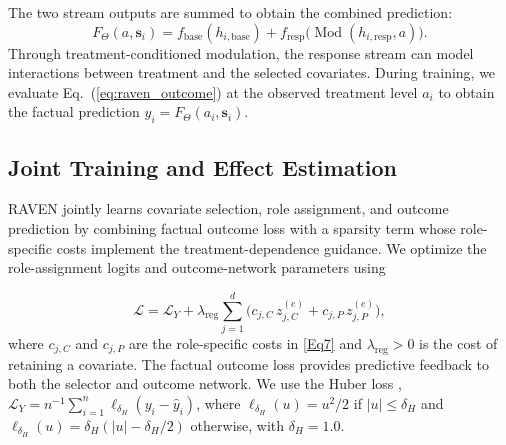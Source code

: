 \documentclass[twoside]{article}
\theoremstyle{plain}
\theoremstyle{definition}
\theoremstyle{remark}
\newtheorem{proof sketch}[theorem]{Proof Sketch}
\begin{document}
The two stream outputs are summed to obtain the combined prediction:
\begin{equation}
\label{eq:raven_outcome}
F_\Theta(a,\mathbf{s}_i)
=
f_{\mathrm{base}}(h_{i,\mathrm{base}})
+
f_{\mathrm{resp}}\bigl(\operatorname{Mod}(h_{i,\mathrm{resp}},a)\bigr).
\end{equation}
Through treatment-conditioned modulation, the response stream can model interactions between treatment and the selected covariates.
During training, we evaluate Eq.~(\ref{eq:raven_outcome}) at the observed treatment level $a_i$ to obtain the factual prediction $\widehat{y}_i=F_\Theta(a_i,\mathbf{s}_i)$.

\subsection{Joint Training and Effect Estimation}
\label{sec:end_to_end_training}
RAVEN jointly learns covariate selection, role assignment, and outcome prediction by combining factual outcome loss with a sparsity term whose role-specific costs implement the treatment-dependence guidance.
We optimize the role-assignment logits and outcome-network parameters using


\begin{equation}
\label{eq:raven_training}
\mathcal{L}=\mathcal{L}_Y+\lambda_{\mathrm{reg}}\sum_{j=1}^{d}\bigl(c_{j,C}\,z_{j,C}^{(e)}+c_{j,P}\,z_{j,P}^{(e)}\bigr),
\end{equation}
where $c_{j,C}$ and $c_{j,P}$ are the role-specific costs in \cref{Eq7} and $\lambda_{\mathrm{reg}}>0$ is the cost of retaining a covariate.
The factual outcome loss provides predictive feedback to both the selector and outcome network.
We use the Huber loss \citep{huber1992robust}, $\mathcal{L}_Y=n^{-1}\sum_{i=1}^{n}\ell_{\delta_H}(y_i-\widehat{y}_i)$, where $\ell_{\delta_H}(u)=u^2/2$ if $|u|\leq\delta_H$ and $\ell_{\delta_H}(u)=\delta_H(|u|-\delta_H/2)$ otherwise, with $\delta_H=1.0$.

\end{document}
